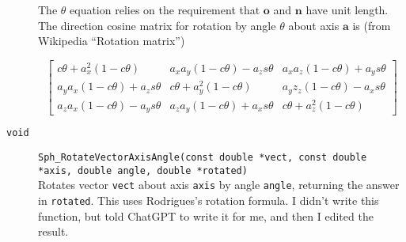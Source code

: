 \documentclass[11pt]{article}
\newcommand {\ttt} {\texttt}
\begin{document}
\begin{description}
The $\theta$ equation relies on the requirement that $\bm{o}$ and $\bm{n}$ have unit length. The direction cosine matrix for rotation by angle $\theta$ about axis $\bm{a}$ is (from Wikipedia ``Rotation matrix'')

$$\left[ \begin{array}{ccc}
c\theta+ a_x^2(1-c\theta) & a_x a_y(1-c\theta)-a_z s\theta & a_x a_z (1-c\theta)+a_y s\theta \\
a_y a_x(1-c\theta)+a_zs\theta & c\theta + a_y^2(1-c\theta) & a_y z_z(1-c\theta)-a_x s\theta \\
a_z a_x(1-c\theta)-a_y s\theta & a_z a_y(1-c\theta) + a_x s\theta & c\theta + a_z^2(1-c\theta)
\end{array} \right ]$$


\item[\ttt{void}]
\ttt{Sph\_RotateVectorAxisAngle(const double *vect, const double *axis, double angle, double *rotated)}
\hfill \\
Rotates vector \ttt{vect} about axis \ttt{axis} by angle \ttt{angle}, returning the answer in \ttt{rotated}. This uses Rodrigues's rotation formula. I didn't write this function, but told ChatGPT to write it for me, and then I edited the result.

\end{description}



\end{document}
